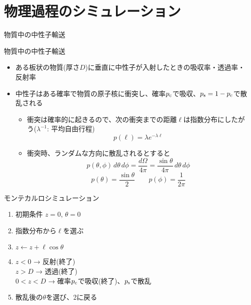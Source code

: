 \section{物理過程のシミュレーション}

\begin{frame}[t,fragile]{物質中の中性子輸送}
  \begin{center}
  \end{center}
\end{frame}

\begin{frame}[t,fragile]{物質中の中性子輸送}
  \begin{itemize}
  \item ある板状の物質(厚さ$D$)に垂直に中性子が入射したときの吸収率・透過率・反射率
  \item 中性子はある確率で物質の原子核に衝突し、確率$p_{\rm c}$で吸収、$p_{\rm s}=1-p_{\rm c}$で散乱される
    \begin{itemize}
    \item 衝突は確率的に起きるので、次の衝突までの距離$\ell$は指数分布にしたがう($\lambda^{-1}$: 平均自由行程)
      \[
      p(\ell) = \lambda e^{-\lambda\ell}
      \]
    \item 衝突時、ランダムな方向に散乱されるとすると
      \[
      p(\theta,\phi) \, d\theta \, d\phi = \frac{d\Omega}{4\pi} = \frac{\sin \theta}{4\pi} \, d\theta \, d\phi
      \]
      \[
      p(\theta) = \frac{\sin \theta}{2} \qquad p(\phi)=\frac{1}{2\pi}
      \]
    \end{itemize}
  \end{itemize}
\end{frame}

\begin{frame}[t,fragile]{モンテカルロシミュレーション}
  \begin{enumerate}
  \item 初期条件 $z=0$, $\theta = 0$
  \item {\color{red} 指数分布から$\ell$を選ぶ}
  \item $z \leftarrow z + \ell \cos \theta$
  \item $z<0$ → 反射(終了) \\
    $z>D$ → 透過(終了) \\
    $0 < z < D$ → 確率$p_{\rm c}$で吸収(終了)、$p_{\rm s}$で散乱
  \item {\color{red} 散乱後の$\theta$を選び}、2に戻る
  \end{enumerate}
  \vspace*{-3.5cm}\hspace{8cm}
\end{frame}

